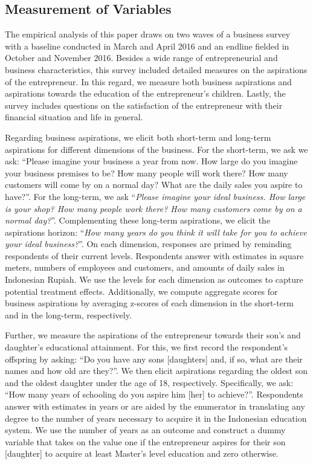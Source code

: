 \documentclass[11.5pt]{article}
\begin{document}
\subsection{Measurement of Variables}

The empirical analysis of this paper draws on two waves of a business survey with a baseline conducted in March and April 2016 and an endline fielded in October and November 2016. Besides a wide range of entrepreneurial and business characteristics, this survey included detailed measures on the aspirations of the entrepreneur. In this regard, we measure both business aspirations and aspirations towards the education of the entrepreneur's children. Lastly, the survey includes questions on the satisfaction of the entrepreneur with their financial situation and life in general.

Regarding business aspirations, we elicit both short-term and long-term aspirations for different dimensions of the business. For the short-term, we ask we ask: ``Please imagine your business a year from now. How large do you imagine your business premises to be? How many people will work there? How many customers will come by on a normal day? What are the daily sales you aspire to have?''. For the long-term, we ask ``\emph{Please imagine your ideal business. How large is your shop? How many people work there? How many customers come by on a normal day?}''. Complementing these long-term aspirations, we elicit the aspirations horizon: ``\emph{How many years do you think it will take for you to achieve your ideal business?}''. On each dimension, responses are primed by reminding respondents of their current levels. Respondents answer with estimates in square meters, numbers of employees and customers, and amounts of daily sales in Indonesian Rupiah. We use the levels for each dimension as outcomes to capture potential treatment effects. Additionally, we compute aggregate scores for business aspirations by averaging z-scores of each dimension in the short-term and in the long-term, respectively.

Further, we measure the aspirations of the entrepreneur towards their son's and daughter's educational attainment. For this, we first record the respondent's offspring by asking: ``Do you have any sons [daughters] and, if so, what are their names and how old are they?''. We then elicit aspirations regarding the oldest son and the oldest daughter under the age of 18, respectively. Specifically, we ask: ``How many years of schooling do you aspire him [her] to achieve?''. Respondents answer with estimates in years or are aided by the enumerator in translating any degree to the number of years necessary to acquire it in the Indonesian education system. We use the number of years as an outcome and construct a dummy variable that takes on the value one if the entrepreneur aspires for their son [daughter] to acquire at least Master's level education and zero otherwise.
\end{document}
